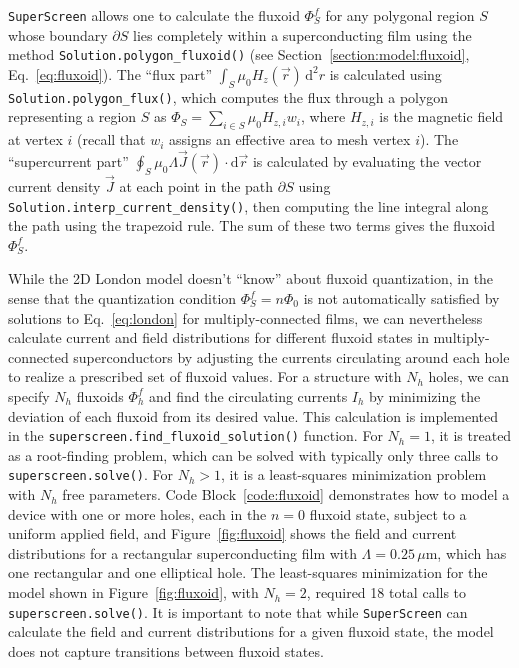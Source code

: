 \documentclass[final,3p,times,twocolumn]{elsarticle}
\newcommand{\inline}[1]{\texttt{#1}\xspace}
\newcommand{\SuperScreen}{\inline{SuperScreen}}
\newcommand{\um}{\mu\mathrm{m}}
\begin{document}
\SuperScreen allows one to calculate the fluxoid $\Phi^f_S$ for any polygonal region $S$ whose boundary $\partial S$ lies completely within a superconducting film using the method \inline{Solution.polygon_fluxoid()} (see Section~\ref{section:model:fluxoid}, Eq.~\ref{eq:fluxoid}). The ``flux part''  $\int_S\mu_0H_z(\vec{r})\,\mathrm{d}^2r$ is calculated using \inline{Solution.polygon_flux()}, which computes the flux through a polygon representing a region $S$ as $\Phi_S=\sum_{i\in S} \mu_0H_{z,i}w_i$, where $H_{z,i}$ is the magnetic field at vertex $i$ (recall that $w_i$ assigns an effective area to mesh vertex $i$). The ``supercurrent part'' $\oint_S\mu_0\Lambda\vec{J}(\vec{r})\cdot\mathrm{d}\vec{r}$ is calculated by evaluating the vector current density $\vec{J}$ at each point in the path $\partial S$ using \inline{Solution.interp_current_density()}, then computing the line integral along the path using the trapezoid rule. The sum of these two terms gives the fluxoid $\Phi^f_S$.

While the 2D London model doesn't ``know'' about fluxoid quantization, in the sense that the quantization condition $\Phi^f_S=n\Phi_0$ is not automatically satisfied by solutions to Eq.~\ref{eq:london} for multiply-connected films, we can nevertheless calculate current and field distributions for different fluxoid states in multiply-connected superconductors by adjusting the currents circulating around each hole to realize a prescribed set of fluxoid values. For a structure with $N_h$ holes, we can specify $N_h$ fluxoids $\Phi^f_h$ and find the circulating currents $I_h$ by minimizing the deviation of each fluxoid from its desired value. This calculation is implemented in the \inline{superscreen.find_fluxoid_solution()} function. For $N_h=1$, it is treated as a root-finding problem, which can be solved with typically only three calls to \inline{superscreen.solve()}. For $N_h>1$, it is a least-squares minimization problem with $N_h$ free parameters. Code Block~\ref{code:fluxoid} demonstrates how to model a device with one or more holes, each in the $n=0$ fluxoid state, subject to a uniform applied field, and Figure~\ref{fig:fluxoid} shows the field and current distributions for a rectangular superconducting film with $\Lambda=0.25\,\um$, which has one rectangular and one elliptical hole. The least-squares minimization for the model shown in Figure~\ref{fig:fluxoid}, with $N_h=2$, required 18 total calls to \inline{superscreen.solve()}. It is important to note that while \SuperScreen can calculate the field and current distributions for a given fluxoid state, the model does not capture transitions between fluxoid states.
\end{document}
